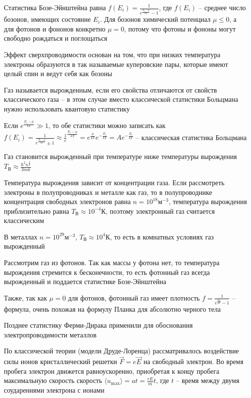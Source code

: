 \documentclass[12pt]{article}
\begin{document}
Статистика Бозе-Эйнштейна равна $f(E_i) = \frac{1}{e^{\frac{E_i - \mu}{kT}} - 1}$, где $f(E_i)$ -- среднее число бозонов, имеющих состояние $E_i$. Для бозонов химический потенциал $\mu \leq 0$, а для фотонов и фононов конкретно $\mu = 0$, потому что фотоны и фононы могут свободно рождаться и поглощаться

Эффект сверхпроводимости основан на том, что при низких температура электроны образуются в так называемые куперовские пары, которые имеют целый спин и ведут себя как бозоны

Газ называется вырожденным, если его свойства отличаются от свойств классического газа -- в этом случае вместо классической статистики Больцмана нужно использовать квантовую статистику

Если $e^{\frac{E_i - \mu}{kT}} \gg 1$, то обе статистики можно записать как $f(E_i) = \frac{1}{e^{\frac{E_i - \mu}{kT}} \pm 1} \approx \frac{1}e^{\frac{E_i - \mu}{kT}} = e^{\frac{\mu}{kT}} e^{-\frac{E_i}{kT}} = A e^{-\frac{E_i}{kT}}$ -- классическая статистика Больцмана

Газ становится вырожденный при температуре ниже температуры вырождения $T_\text{В} \approx \frac{\hbar^2 n^{\frac{2}{3}}}{3mk}$

Температура вырождения зависит от концентрации газа. Если рассмотреть электроны в полупроводниках и металле как газ, то в полупроводнике концентрация свободных электронов равна $n = 10^{18} \text{м}^{-3}$, температура вырождения приблизительно равна $T_{\text{В}} \approx 10^{-4} \text{К}$, поэтому электронный газ считается классическим

В металлах $n = 10^29 \text{м}^{-3}$, $T_{\text{В}} \approx 10^4 \text{К}$, то есть в комнатных условиях газ вырожденный

Рассмотрим газ из фотонов. Так как массы у фотона нет, то температура вырождения стремится к бесконечности, то есть фотонный газ всегда вырожденный и поддается статистике Бозе-Эйнштейна

Также, так как $\mu = 0$ для фотонов, фотонный газ имеет плотность $f = \frac{1}{e^{\frac{h\nu}{kT}} - 1}$ -- формула, очень похожая на формулу Планка для абсолютно черного тела

\mediumvspace

Позднее статистику Ферми-Дирака применили для обоснования электропроводимости металлов

По классической теории (модели Друде-Лоренца) рассматривалось воздействие силы ионов кристаллический решетки $\vec F = e \vec E$ на свободный электрон. Во время пробега электрон движется равноускоренно, приобретая к концу пробега максимальную скорость скорость $\langle u_{\max}\rangle = a t = \frac{e E}{m} t$, где $t$ -- время между двумя соударениями электрона с ионами
\end{document}
